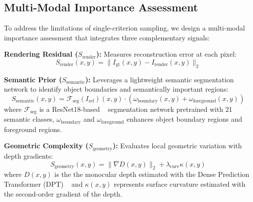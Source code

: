 \documentclass{article}
\begin{document}
  
  
  \subsection{Multi-Modal Importance Assessment}
  \label{subsec:mmia}
  To address the limitations of single-criterion sampling, we design a multi-modal importance assessment that integrates three complementary signals:
  
  \noindent\textbf{Rendering Residual ($S_{\text{render}}$):} Measures reconstruction error at each pixel:
  \begin{equation}
  S_{\text{render}}(x,y) = \|I_{\text{gt}}(x,y) - I_{\text{render}}(x,y)\|_2
  \end{equation}
  
  
  \noindent\textbf{Semantic Prior ($S_{\text{semantic}}$):} Leverages a lightweight semantic segmentation network to identify object boundaries and semantically important regions:
  \begin{equation}
  S_{\text{semantic}}(x,y) = \mathcal{F}_{\text{seg}}(I_{\text{ref}})(x,y) \cdot (\omega_{\text{boundary}}(x,y) + \omega_{\text{foreground}}(x,y))
  \end{equation}
  where $\mathcal{F}_{\text{seg}}$ is a ResNet18-based ~\cite{he2016deep}  segmentation network pretrained with 21 semantic classes, $\omega_{\text{boundary}}$ and  $\omega_{\text{foreground}}$ enhances object boundary regions and foreground regions.
  
  
  
  \noindent\textbf{Geometric Complexity ($S_{\text{geometry}}$):} Evaluates local geometric variation with depth gradients:
  \begin{equation}
  S_{\text{geometry}}(x,y) = \|\nabla D(x,y)\|_2 + \lambda_{\text{curv}} \kappa(x,y)
  \end{equation}
  where $D(x,y)$ is the the  monocular depth estimated with the Dense Prediction Transformer (DPT) ~\cite{ranftl2021vision} and $\kappa(x,y)$ represents surface curvature estimated with the second-order gradient of the depth.
  
\end{document}
